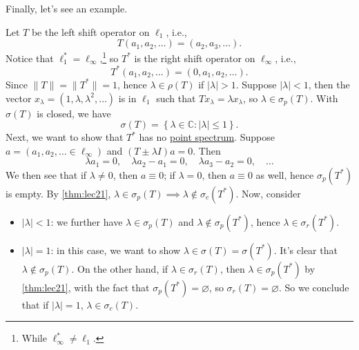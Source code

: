 Finally, let's see an example.

\begin{eg}
	Let \(T\) be the left shift operator on \(\ell _1\), i.e.,
	\[
		T(a_1, a_2, \ldots  )= (a_2, a_3, \ldots  ).
	\]
	Notice that \(\ell _1^{\ast} = \ell _\infty \),\footnote{While \(\ell ^{\ast} _\infty \neq \ell _1\).} so \(T^{\ast} \) is the right shift operator on \(\ell _\infty \), i.e.,
	\[
		T^{\ast} (a_1, a_2, \ldots  ) = (0, a_1, a_2, \ldots  ).
	\]
	Since \(\lVert T \rVert = \lVert T^{\ast}  \rVert = 1\), hence \(\lambda \in \rho (T)\) if \(\vert \lambda  \vert > 1\). Suppose \(\vert \lambda  \vert < 1\), then the vector \(x_\lambda = (1, \lambda , \lambda ^{2} , \ldots  )\) is in \(\ell _1\) such that \(Tx_\lambda = \lambda x_\lambda \), so \(\lambda \in \sigma _p(T)\). With \(\sigma (T)\) is closed, we have
	\[
		\sigma (T) = \left\{ \lambda \in \mathbb{C} \colon \vert \lambda  \vert \leq 1 \right\} .
	\]
	Next, we want to show that \(T^{\ast} \) has no \hyperref[def:point-spectrum]{point spectrum}. Suppose \(a=(a_1, a_2, \ldots  \in \ell _\infty )\) and \((T\pm \lambda I)a=0\). Then
	\[
		\lambda a_1 = 0,\quad
		\lambda a_2 - a_1 = 0,\quad
		\lambda a_3 - a_2 = 0,\quad \ldots
	\]
	We then see that if \(\lambda \neq 0\), then \(a\equiv 0\); if \(\lambda = 0\), then \(a\equiv 0\) as well, hence \(\sigma _p(T^{\ast} )\) is empty. By \autoref{thm:lec21}, \(\lambda \in \sigma _p(T) \implies \lambda \notin \sigma _c(T^{\ast} )\). Now, consider
	\begin{itemize}
		\item \(\vert \lambda  \vert < 1\): we further have \(\lambda \in \sigma _p(T)\) and \(\lambda \notin \sigma _p(T^{\ast} )\), hence \(\lambda \in \sigma _r(T^{\ast} )\).
		\item \(\vert \lambda  \vert = 1\): in this case, we want to show \(\lambda \in \sigma (T) = \sigma (T^{\ast} )\). It's clear that \(\lambda \notin \sigma _p(T)\). On the other hand, if \(\lambda \in \sigma _r(T)\), then \(\lambda \in \sigma _p(T^{\ast} )\) by \autoref{thm:lec21}, with the fact that \(\sigma _p(T^{\ast} ) = \varnothing \), so \(\sigma _r(T) = \varnothing \). So we conclude that if \(\vert \lambda \vert = 1\), \(\lambda \in \sigma _c(T)\).


\end{itemize}
\end{eg}
